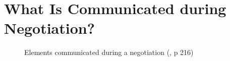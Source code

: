 \documentclass[
  ignorenonframetext,
]{beamer}
\begin{document}
\section{What Is Communicated during
Negotiation?}\label{what-is-communicated-during-negotiation}

\begin{frame}{}
\label{section-11}
\begin{figure}


\caption{\label{fig-elements-communicated-in-a-negotiation}Elements
communicated during a negotiation
(, p 216)}

\end{figure}%
\end{frame}
\end{document}

